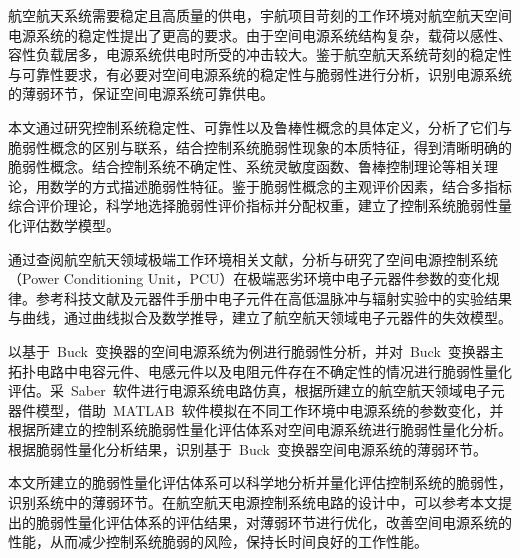 \begin{cabstract}  
 航空航天系统需要稳定且高质量的供电，宇航项目苛刻的工作环境对航空航天空间电源系统的稳定性提出了更高的要求。由于空间电源系统结构复杂，载荷以感性、容性负载居多，电源系统供电时所受的冲击较大。鉴于航空航天系统苛刻的稳定性与可靠性要求，有必要对空间电源系统的稳定性与脆弱性进行分析，识别电源系统的薄弱环节，保证空间电源系统可靠供电。

本文通过研究控制系统稳定性、可靠性以及鲁棒性概念的具体定义，分析了它们与脆弱性概念的区别与联系，结合控制系统脆弱性现象的本质特征，得到清晰明确的脆弱性概念。结合控制系统不确定性、系统灵敏度函数、鲁棒控制理论等相关理论，用数学的方式描述脆弱性特征。鉴于脆弱性概念的主观评价因素，结合多指标综合评价理论，科学地选择脆弱性评价指标并分配权重，建立了控制系统脆弱性量化评估数学模型。

通过查阅航空航天领域极端工作环境相关文献，分析与研究了空间电源控制系统（Power Conditioning Unit，PCU）在极端恶劣环境中电子元器件参数的变化规律。参考科技文献及元器件手册中电子元件在高低温脉冲与辐射实验中的实验结果与曲线，通过曲线拟合及数学推导，建立了航空航天领域电子元器件的失效模型。

以基于~Buck~变换器的空间电源系统为例进行脆弱性分析，并对~Buck~变换器主拓扑电路中电容元件、电感元件以及电阻元件存在不确定性的情况进行脆弱性量化评估。采~Saber~软件进行电源系统电路仿真，根据所建立的航空航天领域电子元器件模型，借助~MATLAB~软件模拟在不同工作环境中电源系统的参数变化，并根据所建立的控制系统脆弱性量化评估体系对空间电源系统进行脆弱性量化分析。根据脆弱性量化分析结果，识别基于~Buck~变换器空间电源系统的薄弱环节。

本文所建立的脆弱性量化评估体系可以科学地分析并量化评估控制系统的脆弱性，识别系统中的薄弱环节。在航空航天电源控制系统电路的设计中，可以参考本文提出的脆弱性量化评估体系的评估结果，对薄弱环节进行优化，改善空间电源系统的性能，从而减少控制系统脆弱的风险，保持长时间良好的工作性能。

\end{cabstract}


